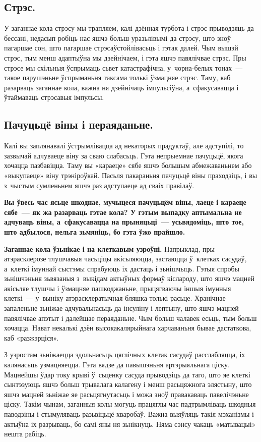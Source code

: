 \subsection*{Стрэс.}

У заганнае кола стрэсу мы трапляем, калі дзённая турбота і стрэс прыводзяць да бессані, недасып робіць нас яшчэ больш уразьлівымі да стрэсу, што зноў пагаршае сон, што пагаршае стрэсаўстойлівасьць і гэтак далей. Чым вышэй стрэс, тым менш адаптыўна мы дзейнічаем, і гэта яшчэ павялічвае стрэс. Пры стрэсе мы схільныя ўспрымаць сьвет катастрафічна, у~чорна-белых тонах~--- такое парушэньне ўспрыманьня таксама толькі ўзмацняе стрэс. Таму, каб разарваць заганнае кола, важна ня дзейнічаць імпульсіўна, а~сфакусавацца і ўтаймаваць стрэсавыя імпульсы.

\subsection*{Пачуцьцё віны і пераяданьне.}

Калі вы заплянавалі ўстрымлівацца ад некаторых прадуктаў, але адступілі, то зазвычай адчуваеце віну за сваю слабасьць. Гэта непрыемнае пачуцьцё, якога хочацца пазбавіцца. Таму вы «караеце» сябе яшчэ большым абмежаваньнем або «выкупаеце» віну трэніроўкай. Пасьля пакараньня пачуцьцё віны праходзіць, і вы з~чыстым сумленьнем яшчэ раз адступаеце ад сваіх правілаў. 

\textbf{Вы ўвесь час ясьце шкоднае, мучыцеся пачуцьцём віны, лаеце і караеце сябе~--- як жа разарваць гэтае кола? У гэтым выпадку аптымальна не адчуваць віны, а~сфакусавацца на прыняцьці~--- усьвядоміць, што тое, што адбылося, нельга зьмяніць, бо гэта ўжо прайшло.}

\textbf{Заганнае кола ўзьнікае і на клеткавым узроўні.} Напрыклад, пры атэрасклерозе тлушчавыя часьціцы акісьляюцца, застаюцца ў~клетках сасудаў, а~клеткі імуннай сыстэмы спрабуюць іх дастаць і зьнішчыць. Гэтыя спробы зьнішчэньня зьвязаныя з~выкідам актыўных формаў кіслароду, што яшчэ мацней акісьляе тлушчы і ўзмацняе пашкоджаньне, прыцягваючы іншыя імунныя клеткі~--- у~выніку атэрасклератычная бляшка толькі расьце. Хранічнае запаленьне зьніжае адчувальнасьць да інсуліну і лептыну, што яшчэ мацней павялічвае апэтыт і далейшае пераяданьне. Чым больш чалавек есьць, тым больш хочацца. Нават некалькі дзён высокакалярыйнага харчаваньня бывае дастаткова, каб «разжэрціся».

З узростам зьніжаецца здольнасьць цяглічных клетак сасудаў расслабляцца, іх калянасьць узмацняецца. Гэта вядзе да павышэньня артэрыяльнага ціску. Мацнейшы ўдар току крыві ў~сьценку сасуда прыводзіць да таго, што яе клеткі сынтэзуюць яшчэ больш трывалага калагену і менш расьцяжнога элястыну, што яшчэ мацней зьніжае яе расьцягнутасьць і можа зноў правакаваць павелічэньне ціску. Такім чынам, заганныя колы могуць працяглы час падтрымліваць шкодныя паводзіны і стымуляваць разьвіцьцё хваробаў. Важна выяўляць такія мэханізмы і актыўна іх разрываць, бо самі яны ня зьнікнуць. Няма сэнсу чакаць «матывацыі» нешта рабіць.

